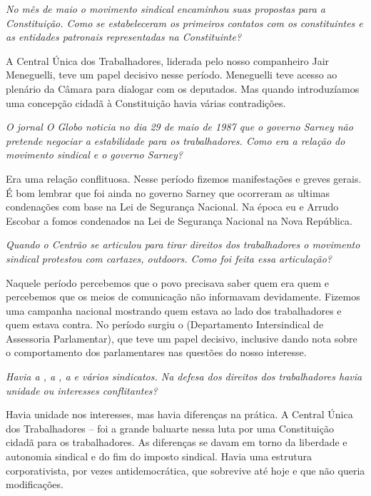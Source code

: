 \medskip

\noindent\emph{No mês de maio o movimento sindical encaminhou suas propostas
para a Constituição. Como se estabeleceram os primeiros contatos com os
constituintes e as entidades patronais representadas na Constituinte?}

A Central Única dos Trabalhadores, liderada pelo
nosso companheiro Jair Meneguelli, teve um papel decisivo nesse período.
Meneguelli teve acesso ao plenário da Câmara para dialogar com os
deputados. Mas quando introduzíamos uma concepção cidadã à Constituição
havia várias contradições.

\medskip

\noindent\emph{O jornal O Globo noticia no dia 29 de maio de 1987 que o governo
Sarney não pretende negociar a estabilidade para os trabalhadores.
Como era a relação do movimento sindical e o governo Sarney?}

Era uma relação conflituosa. Nesse período fizemos
manifestações e greves gerais. É bom lembrar que foi ainda no governo
Sarney que ocorreram as ultimas condenações com base na Lei de Segurança
Nacional. Na época eu e Arrudo Escobar a fomos condenados na Lei de
Segurança Nacional na Nova República.

\medskip

\noindent\emph{Quando o Centrão se articulou para tirar direitos dos
trabalhadores o movimento sindical protestou com cartazes, outdoors.
Como foi feita essa articulação?}

Naquele período percebemos que o povo precisava
saber quem era quem e percebemos que os meios de comunicação não
informavam devidamente. Fizemos uma campanha nacional mostrando quem
estava ao lado dos trabalhadores e quem estava contra. No período surgiu
o  (Departamento Intersindical de Assessoria Parlamentar), que teve
um papel decisivo, inclusive dando nota sobre o comportamento dos
parlamentares nas questões do nosso interesse.

\medskip

\noindent\emph{Havia a , a , a  e vários sindicatos. Na defesa dos
direitos dos trabalhadores havia unidade ou interesses conflitantes?}

Havia unidade nos interesses, mas havia diferenças
na prática. A Central Única dos Trabalhadores --  foi a grande
baluarte nessa luta por uma Constituição cidadã para os trabalhadores.
As diferenças se davam em torno da liberdade e autonomia sindical e do
fim do imposto sindical. Havia uma estrutura corporativista, por vezes
antidemocrática, que sobrevive até hoje e que não queria modificações.

